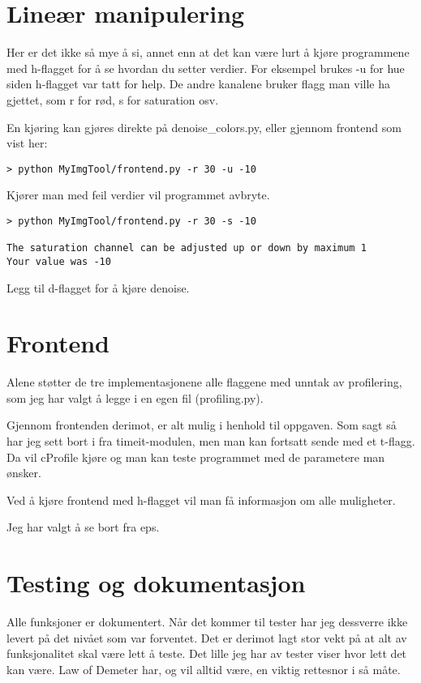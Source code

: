 \documentclass{article}
\begin{document}
\section{Lineær manipulering}
Her er det ikke så mye å si, annet enn at det kan være lurt
å kjøre programmene med h-flagget for å se hvordan du setter verdier.
For eksempel brukes -u for hue siden h-flagget var tatt for help.
De andre kanalene bruker flagg man ville ha gjettet, som r for rød, s for saturation osv.

En kjøring kan gjøres direkte på denoise\_colors.py, eller gjennom
frontend som vist her:
\begin{Verbatim}[numbers=none,frame=lines,label=\fbox{{\tiny Terminal}},fontsize=\fontsize{9pt}{9pt},
labelposition=topline,framesep=2.5mm,framerule=0.7pt]
> python MyImgTool/frontend.py -r 30 -u -10
\end{Verbatim}
\noindent

Kjører man med feil verdier vil programmet avbryte.
\begin{Verbatim}[numbers=none,frame=lines,label=\fbox{{\tiny Terminal}},fontsize=\fontsize{9pt}{9pt},
labelposition=topline,framesep=2.5mm,framerule=0.7pt]
> python MyImgTool/frontend.py -r 30 -s -10

The saturation channel can be adjusted up or down by maximum 1
Your value was -10
\end{Verbatim}
\noindent

Legg til d-flagget for å kjøre denoise.

\section{Frontend}
Alene støtter de tre implementasjonene alle flaggene med unntak av
profilering, som jeg har valgt å legge i en egen fil (profiling.py).

Gjennom frontenden derimot, er alt mulig i henhold til oppgaven.
Som sagt så har jeg sett bort i fra timeit-modulen, men man kan
fortsatt sende med et t-flagg. Da vil cProfile kjøre og man
kan teste programmet med de parametere man ønsker.

Ved å kjøre frontend med h-flagget vil man få informasjon om alle muligheter.

Jeg har valgt å se bort fra eps.

\section{Testing og dokumentasjon}
Alle funksjoner er dokumentert.
Når det kommer til tester har jeg dessverre ikke levert på det nivået som
var forventet. Det er derimot lagt stor vekt på at alt av funksjonalitet
skal være lett å teste.
Det lille jeg har av tester viser hvor lett det kan være.
Law of Demeter har, og vil alltid være, en viktig rettesnor i så måte.
\end{document}
